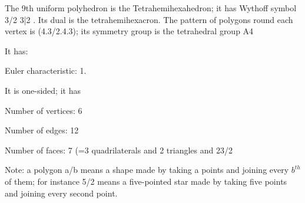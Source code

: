 The 9th uniform polyhedron is the Tetrahemihexahedron; it has 
Wythoff symbol 3/2 3|2 . Its dual is the tetrahemihexacron. The pattern of 
polygons round each vertex is (4.3/2.4.3); its symmetry group is the
 tetrahedral group A4
\par
It has:
\par
Euler characteristic: 1.\par
It is one-sided; it has
\par
Number of vertices: 6\par
Number of edges:  12
\par
Number of faces: 7 (=3 quadrilaterals and 2 triangles and 2{3/2}

\par
Note: a polygon a/b means a shape made by taking a points and joining every $b^{th}$  of them; for instance 5/2 means a five-pointed star made by taking five points and joining every second point.